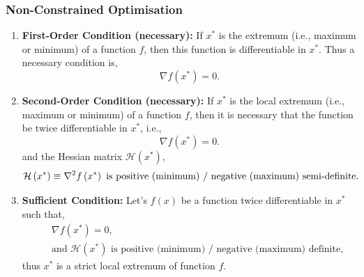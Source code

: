 \subsubsection{Non-Constrained Optimisation}
  \begin{enumerate}[{\bf i)}]
      \item {\bf First-Order Condition (necessary):} If $x^{\ast}$ is the extremum (i.e., maximum or minimum) of a function $f$, then this function is differentiable in $x^{\ast}$. Thus a necessary condition is,
          \begin{displaymath}
             \nabla f\left(x^{\ast}\right) = 0.
          \end{displaymath}
      \item  {\bf Second-Order Condition (necessary):} If $x^{\ast}$ is the local extremum (i.e., maximum or minimum) of a function $f$, then it is necessary that the function be twice differentiable in $x^{\ast}$, i.e.,
          \begin{displaymath}
             \nabla f\left(x^{\ast}\right) = 0.
          \end{displaymath}
and the Hessian matrix $\mathcal{H}\left(x^{\ast}\right)$,
          \begin{displaymath}
             \mathcal{H}\left(x^{\ast}\right) \equiv \nabla^{2} f\left(x^{\ast}\right) \text{ is positive (minimum) / negative (maximum) semi-definite}.\index{Hessian matrix ! Conditions of optimality}
          \end{displaymath}
      \item {\bf Sufficient Condition:} Let's $f(x)$ be a function twice differentiable in $x^{\ast}$ such that,
          \begin{eqnarray}
             &&\nabla f\left(x^{\ast}\right) = 0, \nonumber \\
             && \text{and } \mathcal{H}\left(x^{\ast}\right) \text{ is positive (minimum) / negative (maximum) definite,} \nonumber 
          \end{eqnarray}
           thus $x^{\ast}$ is a strict local extremum of function $f$.
  \end{enumerate}

